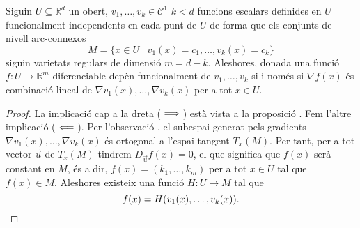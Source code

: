 \documentclass[../Apunts.tex]{subfiles}
\begin{document}
	\begin{proposition}Siguin \(U\subseteq\mathbb{R}^{d}\) un obert, \(v_{1},\dots,v_{k}\in\mathcal{C}^{1}\) \(k<d\) funcions escalars definides en \(U\) funcionalment independents en cada punt de \(U\) de forma que els conjunts de nivell arc-connexos
		\[M=\{x\in U\mid v_{1}(x)=c_{1},\dots,v_{k}(x)=c_{k}\}\]
		siguin varietats regulars de dimensió \(m=d-k\). Aleshores, donada una funció \(f\colon U\to\mathbb{R}^{m}\) diferenciable depèn funcionalment de \(v_{1},\dots,v_{k}\) si i només si \(\nabla f(x)\) és combinació lineal de \(\nabla v_{1}(x),\dots,\nabla v_{k}(x)\) per a tot \(x\in U\).
		\begin{proof}
			La implicació cap a la dreta (\(\implies\)) està vista a la proposició . Fem l'altre implicació (\(\impliedby\)).
			Per l'observació , el subespai generat pels gradients \(\nabla v_{1}(x),\dots,\nabla v_{k}(x)\) és ortogonal a l'espai tangent \(T_{x}(M)\). Per tant, per a tot vector \(\vec{u}\) de \(T_{x}(M)\) tindrem \(D_{\vec{u}}f(x)=0\), el que significa que \(f(x)\) serà constant en \(M\), és a dir, \(f(x)=(k_{1},\dots,k_{m})\) per a tot \(x\in U\) tal que \(f(x)\in M\). Aleshores existeix una funció \(H\colon U\rightarrow M\) tal que
			\[f(x)=H(v_{1}(x),\dots,v_{k}(x)).\qedhere\]
		\end{proof}
	\end{proposition}
\end{document}
